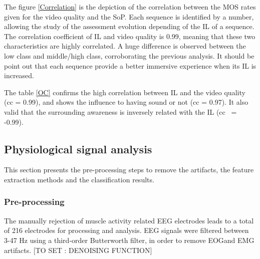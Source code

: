 The figure \ref{Correlation} is the depiction of the correlation between the \ac{MOS} rates given for the video quality and the \ac{SoP}. Each sequence is identified by a number, allowing the study of the assessment evolution depending of the \ac{IL} of a sequence.
The correlation coefficient of \ac{IL} and video quality is 0.99, meaning that these two characteristics are highly correlated. A huge difference is observed between the low class and middle/high class, corroborating the previous analysis. It should be point out that each sequence provide a better immersive experience when its \ac{IL} is increased.


\begin{table}[h]
\end{table}

The table \ref{OC} confirms the high correlation between \ac{IL} and the video quality (cc = 0.99), and shows the influence to having sound or not (cc = 0.97). It also valid that the surrounding awareness is inversely related with the \ac{IL} (cc ~= -0.99).


\subsection{Physiological signal analysis}
This section presents the pre-processing steps to remove the artifacts, the feature extraction methods and the classification results.

\subsubsection{Pre-processing}
The manually rejection of muscle activity related \ac{EEG} electrodes leads to a total of 216 electrodes for processing and analysis. \ac{EEG} signals were filtered between 3-47 Hz using a third-order Butterworth filter, in order to remove \ac{EOG}and \ac{EMG} artifacts.
[TO SET : DENOISING FUNCTION]

